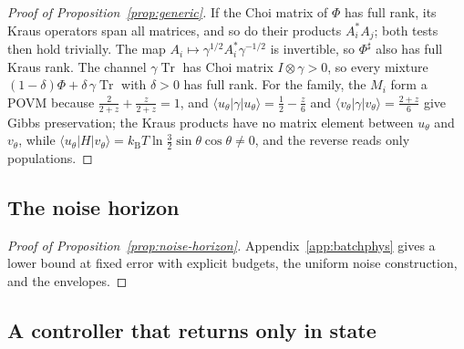 \documentclass[11pt]{article}
\theoremstyle{definition}
\theoremstyle{remark}
\newcommand{\Tr}{\operatorname{Tr}}
\newcommand{\kB}{k_{\mathrm B}}
\begin{document}
\begin{proof}[Proof of Proposition~\ref{prop:generic}]
If the Choi matrix of $\Phi$ has full rank, its Kraus operators span all matrices, and so do their products $A_i^*A_j$; both tests then hold trivially. The map $A_i\mapsto\gamma^{1/2}A_i^*\gamma^{-1/2}$ is invertible, so $\Phi^\sharp$ also has full Kraus rank. The channel $\gamma\Tr$ has Choi matrix $I\otimes\gamma>0$, so every mixture $(1-\delta)\Phi+\delta\,\gamma\Tr$ with $\delta>0$ has full rank. For the family, the $M_i$ form a POVM because $\frac2{2+z}+\frac z{2+z}=1$, and $\langle u_\theta|\gamma|u_\theta\rangle=\frac12-\frac z6$ and $\langle v_\theta|\gamma|v_\theta\rangle=\frac{2+z}6$ give Gibbs preservation; the Kraus products have no matrix element between $u_\theta$ and $v_\theta$, while $\langle u_\theta|H|v_\theta\rangle=\kB T\ln\frac32\sin\theta\cos\theta\ne0$, and the reverse reads only populations.
\end{proof}

\subsection{The noise horizon}\label{pf:noise}

\begin{proof}[Proof of Proposition~\ref{prop:noise-horizon}]
Appendix~\ref{app:batchphys} gives a lower bound at fixed error with explicit budgets, the uniform noise construction, and the envelopes.
\end{proof}

\subsection{A controller that returns only in state}\label{pf:embezzle}
\end{document}
